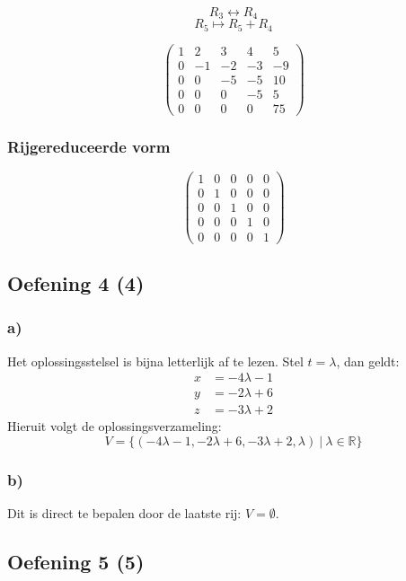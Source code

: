 \documentclass[lineaire_algebra_oplossingen.tex]{subfiles}
\begin{document}
\[R_3 \leftrightarrow R_4\]
\[ R_5 \longmapsto R_5 + R_4\]

\[
\begin{pmatrix}
1 &  2 &  3 &  4 &  5\\
0 & -1 & -2 & -3 & -9\\
0 &  0 & -5 & -5 & 10\\
0 &  0 &  0 & -5 &  5\\
0 &  0 &  0 &  0 & 75 
\end{pmatrix}
\]
\subsubsection*{Rijgereduceerde vorm}
\[
\begin{pmatrix}
1 &  0 &  0 &  0 & 0\\
0 &  1 &  0 &  0 & 0\\
0 &  0 &  1 &  0 & 0\\
0 &  0 &  0 &  1 & 0\\
0 &  0 &  0 &  0 & 1 
\end{pmatrix}
\]

\subsection{Oefening 4 (4)}
\subsubsection*{a)}
Het oplossingsstelsel is bijna letterlijk af te lezen. Stel $t=\lambda$, dan geldt:
\begin{align*}
x &= -4\lambda - 1\\
y &= -2\lambda + 6\\
z &= -3\lambda + 2
\end{align*}
Hieruit volgt de oplossingsverzameling:
\[
V=\{(-4\lambda - 1,-2\lambda + 6,-3\lambda + 2, \lambda)\ |\ \lambda \in \mathbb{R}\}
\]
\subsubsection*{b)}
Dit is direct te bepalen door de laatste rij: $V=\emptyset$.
\subsection{Oefening 5 (5)}
\end{document}
